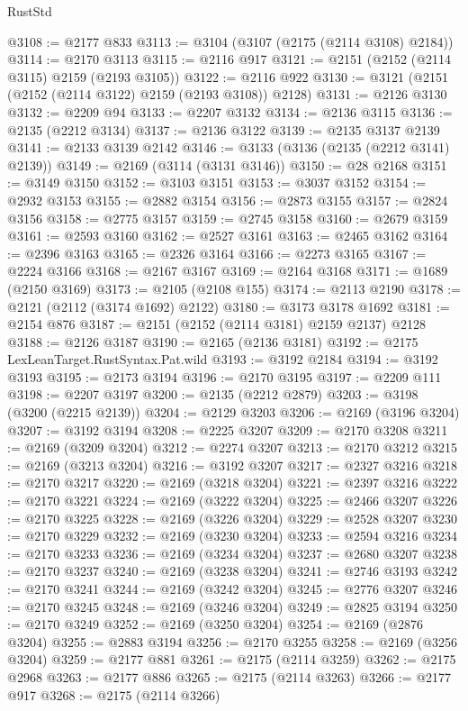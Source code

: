 \begin{lexlean}{RustStd}
\begin{coremodule}
{\begin{coremodule}
{{{{{{{{{{{{{{{{@3108 := @2177 @833
@3113 := @3104 (@3107 (@2175 (@2114 @3108) @2184))
@3114 := @2170 @3113
@3115 := @2116 @917
@3121 := @2151 (@2152 (@2114 @3115) @2159 (@2193 @3105))
@3122 := @2116 @922
@3130 := @3121 (@2151 (@2152 (@2114 @3122) @2159 (@2193 @3108)) @2128)
@3131 := @2126 @3130
@3132 := @2209 @94
@3133 := @2207 @3132
@3134 := @2136 @3115
@3136 := @2135 (@2212 @3134)
@3137 := @2136 @3122
@3139 := @2135 @3137 @2139
@3141 := @2133 @3139 @2142
@3146 := @3133 (@3136 (@2135 (@2212 @3141) @2139))
@3149 := @2169 (@3114 (@3131 @3146))
@3150 := @28 @2168
@3151 := @3149 @3150
@3152 := @3103 @3151
@3153 := @3037 @3152
@3154 := @2932 @3153
@3155 := @2882 @3154
@3156 := @2873 @3155
@3157 := @2824 @3156
@3158 := @2775 @3157
@3159 := @2745 @3158
@3160 := @2679 @3159
@3161 := @2593 @3160
@3162 := @2527 @3161
@3163 := @2465 @3162
@3164 := @2396 @3163
@3165 := @2326 @3164
@3166 := @2273 @3165
@3167 := @2224 @3166
@3168 := @2167 @3167
@3169 := @2164 @3168
@3171 := @1689 (@2150 @3169)
@3173 := @2105 (@2108 @155)
@3174 := @2113 @2190
@3178 := @2121 (@2112 (@3174 @1692) @2122)
@3180 := @3173 @3178 @1692
@3181 := @2154 @876
@3187 := @2151 (@2152 (@2114 @3181) @2159 @2137) @2128
@3188 := @2126 @3187
@3190 := @2165 (@2136 @3181)
@3192 := @2175 LexLeanTarget.RustSyntax.Pat.wild
@3193 := @3192 @2184
@3194 := @3192 @3193
@3195 := @2173 @3194
@3196 := @2170 @3195
@3197 := @2209 @111
@3198 := @2207 @3197
@3200 := @2135 (@2212 @2879)
@3203 := @3198 (@3200 (@2215 @2139))
@3204 := @2129 @3203
@3206 := @2169 (@3196 @3204)
@3207 := @3192 @3194
@3208 := @2225 @3207
@3209 := @2170 @3208
@3211 := @2169 (@3209 @3204)
@3212 := @2274 @3207
@3213 := @2170 @3212
@3215 := @2169 (@3213 @3204)
@3216 := @3192 @3207
@3217 := @2327 @3216
@3218 := @2170 @3217
@3220 := @2169 (@3218 @3204)
@3221 := @2397 @3216
@3222 := @2170 @3221
@3224 := @2169 (@3222 @3204)
@3225 := @2466 @3207
@3226 := @2170 @3225
@3228 := @2169 (@3226 @3204)
@3229 := @2528 @3207
@3230 := @2170 @3229
@3232 := @2169 (@3230 @3204)
@3233 := @2594 @3216
@3234 := @2170 @3233
@3236 := @2169 (@3234 @3204)
@3237 := @2680 @3207
@3238 := @2170 @3237
@3240 := @2169 (@3238 @3204)
@3241 := @2746 @3193
@3242 := @2170 @3241
@3244 := @2169 (@3242 @3204)
@3245 := @2776 @3207
@3246 := @2170 @3245
@3248 := @2169 (@3246 @3204)
@3249 := @2825 @3194
@3250 := @2170 @3249
@3252 := @2169 (@3250 @3204)
@3254 := @2169 (@2876 @3204)
@3255 := @2883 @3194
@3256 := @2170 @3255
@3258 := @2169 (@3256 @3204)
@3259 := @2177 @881
@3261 := @2175 (@2114 @3259)
@3262 := @2175 @2968
@3263 := @2177 @886
@3265 := @2175 (@2114 @3263)
@3266 := @2177 @917
@3268 := @2175 (@2114 @3266)
}}}}}}}}}}}}}}}}
\end{coremodule}}
\end{coremodule}
\end{lexlean}
